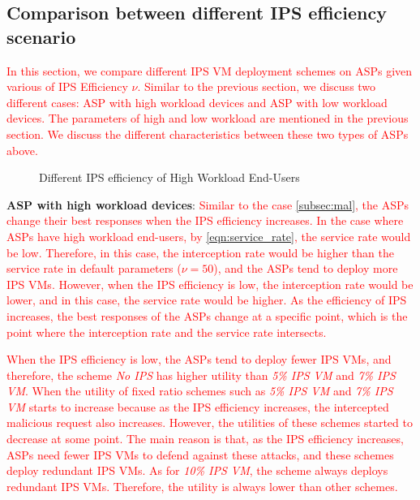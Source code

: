 \documentclass[10pt,journal, compsoc]{IEEEtran}
\begin{document}
\subsection{Comparison between different IPS efficiency scenario}
\textcolor{red}{In this section, we compare different IPS VM deployment schemes on ASPs given various of IPS Efficiency $\nu$. Similar to the previous section, we discuss two different cases: ASP with high workload devices and ASP with low workload devices. The parameters of high and low workload are mentioned in the previous section. We discuss the different characteristics between these two types of ASPs above. }


\begin{figure}[!]
\captionsetup{justification=centering}
  \hfill
  \hfill
\label{fig:eff_high}
\caption{Different IPS efficiency of High Workload End-Users}
\end{figure}
\textbf{ASP with high workload devices}:
\textcolor{red}{
Similar to the case \cref{subsec:mal}, the ASPs change their best responses when the IPS efficiency increases. In the case where ASPs have high workload end-users, by \cref{eqn:service_rate}, the service rate would be low. Therefore, in this case, the interception rate would be higher than the service rate in default parameters ($\nu = 50$), and the ASPs tend to deploy more IPS VMs. However, when the IPS efficiency is low, the interception rate would be lower, and in this case, the service rate would be higher. As the efficiency of IPS increases, the best responses of the ASPs change at a specific point, which is the point where the interception rate and the service rate intersects.}

\textcolor{red}{
When the IPS efficiency is low, the ASPs tend to deploy fewer IPS VMs, and therefore, the scheme \textit{No IPS} has higher utility than \textit{5\% IPS VM} and \textit{7\% IPS VM}. When the utility of fixed ratio schemes such as \textit{5\% IPS VM} and \textit{7\% IPS VM} starts to increase because as the IPS efficiency increases, the intercepted malicious request also increases. However, the utilities of these schemes started to decrease at some point. The main reason is that, as the IPS efficiency increases, ASPs need fewer IPS VMs to defend against these attacks, and these schemes deploy redundant IPS VMs. As for \textit{10\% IPS VM}, the scheme always deploys redundant IPS VMs. Therefore, the utility is always lower than other schemes.}
\end{document}
